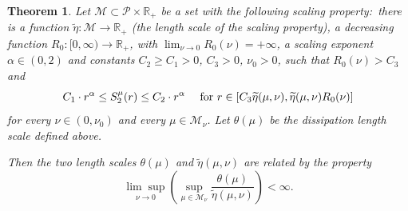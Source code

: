 \documentclass[11pt]{preprint}
\newtheorem{theorem}{Theorem}[section]
\begin{document}
\begin{theorem}
\label{theorem on theta}Let $\mathcal{M}\subset\mathcal{P}\times\mathbb{R}%
_{+}$ be a set with the following scaling property:\ there is a function
$\widetilde{\eta}:\mathcal{M}\rightarrow\mathbb{R}_{+}$ (the length scale of
the scaling property), a decreasing function $R_{0}:[0,\infty)\rightarrow
\mathbb{R}_{+}$, with $\lim_{\nu\rightarrow0}R_{0}\left(  \nu\right)
=+\infty$, a scaling exponent $\alpha\in\left(  0,2\right)  $ and constants
$C_{2}\geq C_{1}>0$, $C_{3}>0$, $\nu_{0}>0$, such that $R_{0}\left(
\nu\right)  >C_{3}$ and
\begin{equation}
C_{1}\cdot r^{\alpha}\leq S_{2}^{\mu}\left(  r\right)  \leq C_{2}\cdot
r^{\alpha}\text{ \quad for }r\in\left[  C_{3}\widetilde{\eta}\left(  \mu
,\nu\right)  ,\widetilde{\eta}\left(  \mu,\nu\right)  R_{0}\left(  \nu\right)
\right]  \label{scaling}%
\end{equation}
for every $\nu\in\left(  0,\nu_{0}\right)  $ and every $\mu\in\mathcal{M}%
_{\nu}$. Let $\theta\left(  \mu\right)  $ be the dissipation length scale
defined above.

Then the two length scales $\theta\left(  \mu\right)  $ and $\widetilde{\eta
}\left(  \mu,\nu\right)  $ are related by the property
\begin{equation}
\underset{\nu\rightarrow0}{\lim\sup}\left(  \sup_{\mu\in\mathcal{M}_{\nu}%
}\frac{\theta\left(  \mu\right)  }{\widetilde{\eta}\left(  \mu,\nu\right)
}\right)  <\infty.\label{comparison}%
\end{equation}
\end{theorem}
\end{document}
